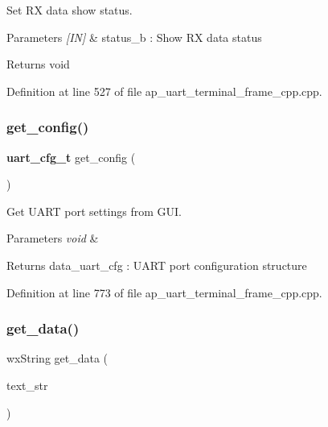Set RX data show status. 


\begin{DoxyParams}{Parameters}
{\em \mbox{[}\+I\+N\mbox{]}} & status\+\_\+b \+: Show RX data status \\
\hline
\end{DoxyParams}
\begin{DoxyReturn}{Returns}
void 
\end{DoxyReturn}


Definition at line 527 of file ap\+\_\+uart\+\_\+terminal\+\_\+frame\+\_\+cpp.\+cpp.

\mbox{\label{group___u_a_r_t__terminal_gab5f10a8a2328c6ded33c452d6c0c8792}} 
\subsubsection{get\_config()}
{\footnotesize\ttfamily \textbf{ uart\+\_\+cfg\+\_\+t} get\+\_\+config (\begin{DoxyParamCaption}\item[{void}]{ }\end{DoxyParamCaption})}



Get U\+A\+RT port settings from G\+UI. 


\begin{DoxyParams}{Parameters}
{\em void} & \\
\hline
\end{DoxyParams}
\begin{DoxyReturn}{Returns}
data\+\_\+uart\+\_\+cfg \+: U\+A\+RT port configuration structure 
\end{DoxyReturn}


Definition at line 773 of file ap\+\_\+uart\+\_\+terminal\+\_\+frame\+\_\+cpp.\+cpp.

\mbox{\label{group___u_a_r_t__terminal_gaa87c4c777f73c1b5d39793e6a75e26d6}} 
\subsubsection{get\_data()}
{\footnotesize\ttfamily wx\+String get\+\_\+data (\begin{DoxyParamCaption}\item[{wx\+String}]{text\+\_\+str }\end{DoxyParamCaption})}



